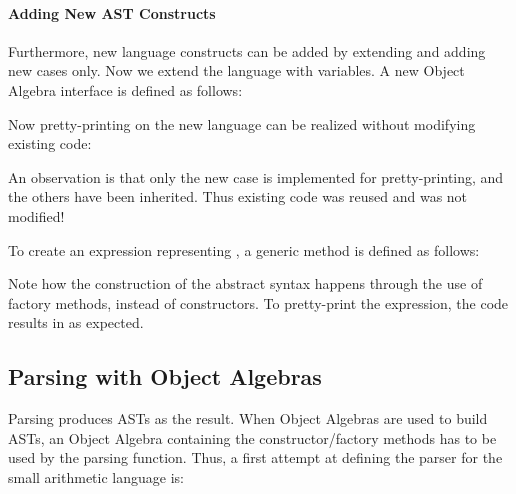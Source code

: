 
\paragraph{Adding New AST Constructs}
Furthermore, new language constructs can be added by extending  and adding new cases only. Now we extend the language
with variables. A new Object Algebra interface  is defined as follows:

\vspace{-4pt}
\vspace{-4pt}
Now pretty-printing on the new language can be realized without modifying existing code:

\vspace{-4pt}
\vspace{-4pt}
An observation is that only the new case is implemented for pretty-printing, and the others have been inherited.
Thus existing code was reused and was not modified!

To create an expression representing , a generic method is defined as follows:

\vspace{-4pt}
\vspace{-4pt}

Note how the construction of the abstract syntax happens through
the use of factory methods, instead of constructors.
To pretty-print the expression, the code 
results in  as expected.

\subsection{Parsing with Object Algebras}\label{subsec:parsingwithoa}

Parsing produces ASTs as the result. When Object Algebras are used
to build ASTs, an Object Algebra containing the constructor/factory
methods has to be used by the parsing function. Thus, a first attempt
at defining the parser for the small arithmetic language is:

